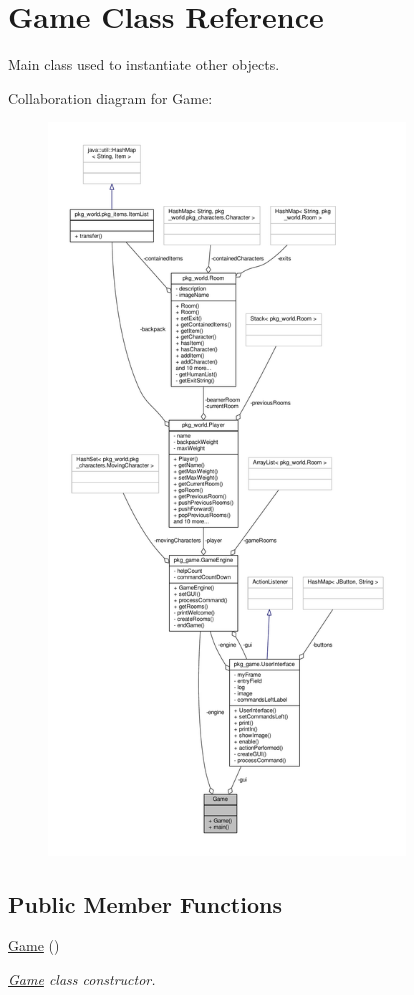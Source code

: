 \hypertarget{classGame}{\section{Game Class Reference}
\label{classGame}
}


Main class used to instantiate other objects.  




Collaboration diagram for Game\-:
\nopagebreak
\begin{figure}[H]
\begin{center}
\leavevmode
\includegraphics[height=550pt]{classGame__coll__graph}
\end{center}
\end{figure}
\subsection*{Public Member Functions}
\begin{DoxyCompactItemize}
\item 
\hyperlink{classGame_a2e034e53e9c032964ecd2a831b29a616}{Game} ()
\begin{DoxyCompactList}\small\item\em \hyperlink{classGame}{Game} class constructor. \end{DoxyCompactList}\end{DoxyCompactItemize}
